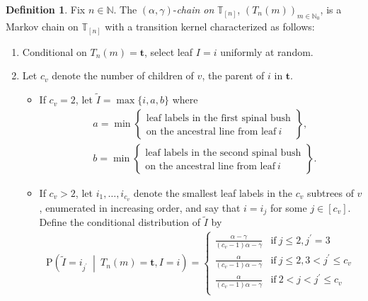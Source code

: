 \documentclass[a4paper, final]{amsart}
\theoremstyle{plain}
\theoremstyle{definition}
\newtheorem{defi}[thm]{Definition}
\newcommand{\tree}[1][t]{\boldsymbol{#1}}
\newcommand{\T}{\mathbb{T}}
\newcommand{\nin}{{n \in \mathbb{N}}}
\renewcommand{\P}{\mathrm{P}}
\newcommand{\N}{\mathbb{N}}
\begin{document}
\begin{defi}%
  \label{def:alphagamma_chain}
  Fix $\nin$.
  The $(\alpha, \gamma)$-\textit{chain on} $\T_{[n]}$, {${\left( T_n(m) \right)}_{m \in \N_0}$}, is a Markov chain on $\T_{[n]}$ with a transition kernel characterized as follows:
  \begin{enumerate}
    \item Conditional on $T_n(m) = \tree$, select leaf $I = i$ uniformly at random.
    \item Let $c_v$ denote the number of children of $v$, the parent of $i$ in $\tree$.
      \begin{itemize}[leftmargin=.5cm]
        \item If $c_v = 2$, let $\tilde{I} = \max \{i, a, b\}$ where 
          \begin{align*}
            &a = \min
            \begin{Bmatrix}
              \text{leaf labels in the first spinal bush} \\ \text{on the ancestral line from leaf}\ i
            \end{Bmatrix}, \\
            &b = 
            \min
            \begin{Bmatrix}
              \text{leaf labels in the second spinal bush} \\ \text{on the ancestral line from leaf}\ i
            \end{Bmatrix}.
          \end{align*}
        \item If $c_v > 2$, let $i_1, \ldots, i_{c_v}$ denote the smallest leaf labels in the $c_v$ subtrees of $v$, enumerated in increasing order, and say that $i = i_j$ for some $j \in [c_v]$.
          Define the conditional distribution of $\tilde{I}$ by
          \begin{align*}
            \P \left( \tilde{I} = i_{j^\prime} \ \middle \vert \ T_n(m) = \tree, I = i \right)
            =
            \begin{cases}
              \frac{\alpha - \gamma}{(c_v - 1)\alpha - \gamma} & \text{if}\ j \leq 2, j^\prime = 3 \\[0.1cm]
              \frac{\alpha}{(c_v - 1)\alpha - \gamma} & \text{if}\ j \leq 2, 3 < j^\prime \leq c_v \\[0.1cm]
              \frac{\alpha}{(c_v - 1)\alpha - \gamma} & \text{if}\ 2 < j < j^\prime \leq c_v \\[0.15cm]

\end{cases}
\end{align*}
\end{itemize}
\end{enumerate}
\end{defi}
\end{document}
